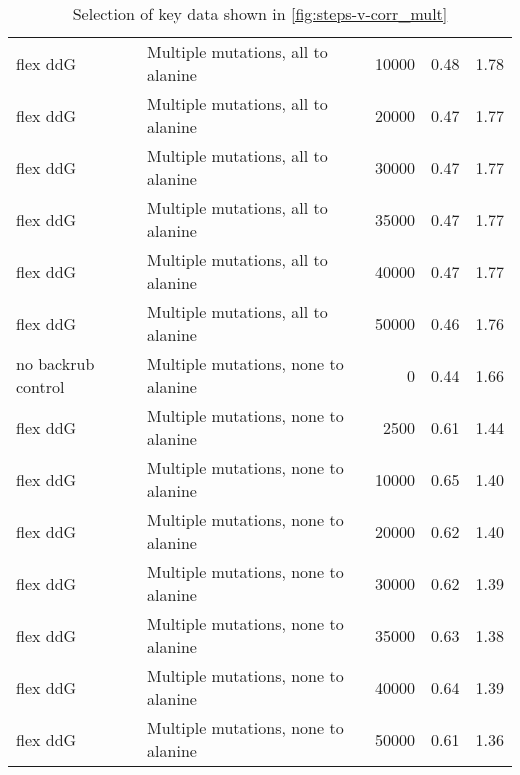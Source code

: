 \begin{table}
\begin{tabular}{llrrr}
           flex ddG &   Multiple mutations, all to alanine &         10000 & 0.48 & 1.78 \\
           flex ddG &   Multiple mutations, all to alanine &         20000 & 0.47 & 1.77 \\
           flex ddG &   Multiple mutations, all to alanine &         30000 & 0.47 & 1.77 \\
           flex ddG &   Multiple mutations, all to alanine &         35000 & 0.47 & 1.77 \\
           flex ddG &   Multiple mutations, all to alanine &         40000 & 0.47 & 1.77 \\
           flex ddG &   Multiple mutations, all to alanine &         50000 & 0.46 & 1.76 \\
 no backrub control &  Multiple mutations, none to alanine &             0 & 0.44 & 1.66 \\
           flex ddG &  Multiple mutations, none to alanine &          2500 & 0.61 & 1.44 \\
           flex ddG &  Multiple mutations, none to alanine &         10000 & 0.65 & 1.40 \\
           flex ddG &  Multiple mutations, none to alanine &         20000 & 0.62 & 1.40 \\
           flex ddG &  Multiple mutations, none to alanine &         30000 & 0.62 & 1.39 \\
           flex ddG &  Multiple mutations, none to alanine &         35000 & 0.63 & 1.38 \\
           flex ddG &  Multiple mutations, none to alanine &         40000 & 0.64 & 1.39 \\
           flex ddG &  Multiple mutations, none to alanine &         50000 & 0.61 & 1.36 \\
\bottomrule
\end{tabular}

\caption[]{Selection of key data shown in \cref{fig:steps-v-corr_mult}}
\label{tab:steps-v-corr_mult-underlying-data}
\end{table}
